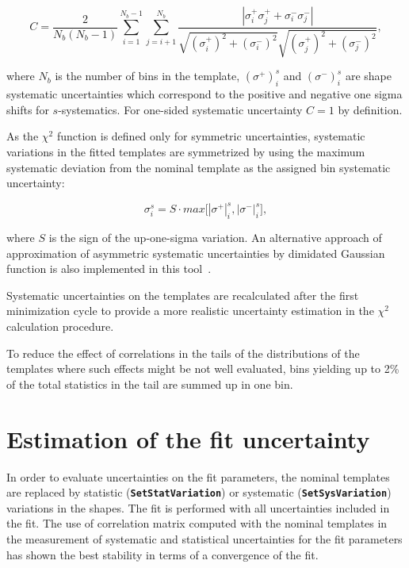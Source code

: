 \documentclass[12pt]{article}
\newcommand\verbbf[1]{\textcolor[rgb]{0,0,1}{\texttt{\textbf{#1}}}}
\begin{document}
\begin{equation}
C = \frac{2}{N_{b}(N_{b}-1)} \sum\limits_{i=1}^{N_{b}-1}
\sum\limits_{j=i+1}^{N_{b}} \frac{|\sigma_{i}^{+}\sigma_{j}^{+} +
\sigma_{i}^{-}\sigma_{j}^{-}|}
{\sqrt{(\sigma_{i}^{+})^{2} + (\sigma_{i}^{-})^{2}}
\sqrt{(\sigma_{j}^{+})^{2} + (\sigma_{j}^{-})^{2}} },
\end{equation}

\noindent where $N_{b}$ is the number of bins in the template, 
$(\sigma^{+})_{i}^{s}$ and $(\sigma^{-})_{i}^{s}$ are
shape systematic uncertainties which correspond to the positive and negative
one sigma shifts for $s$-systematics. 
For one-sided systematic uncertainty $C = 1$ by definition.

As the $\chi^2$ function is defined only for symmetric
uncertainties, systematic variations in the fitted templates are
symmetrized by using the maximum systematic deviation from the nominal
template as the assigned bin systematic uncertainty:

\begin{equation}
\sigma_{i}^{s} = S \cdot max
\bigg[|\sigma^{+}|_{i}^{s},|\sigma^{-}|_{i}^{s}\bigg],
\end{equation}

\noindent where $S$ is the sign of the
up-one-sigma variation. An alternative approach of approximation of
asymmetric systematic uncertainties by dimidated Gaussian function is
also implemented in this tool~\cite{Barlow}.

Systematic uncertainties on the templates are recalculated after the
first minimization cycle to provide a more realistic
uncertainty estimation in the $\chi^2$ calculation procedure.

To reduce the effect of correlations in the tails of the distributions
of the templates where such effects might be not well evaluated, bins
yielding up to 2\% of the total statistics in the tail are summed up in one bin.

\section{Estimation of the fit uncertainty}

In order to evaluate uncertainties on the fit parameters, the nominal
templates are replaced by statistic (\verbbf{SetStatVariation}) or systematic
(\verbbf{SetSysVariation}) variations in the
shapes. The fit is performed with all uncertainties included in the fit.
The use of correlation matrix computed with the nominal templates in the
measurement of systematic and statistical uncertainties for the fit
parameters has shown the best stability in terms of a convergence of
the fit. 
\end{document}
